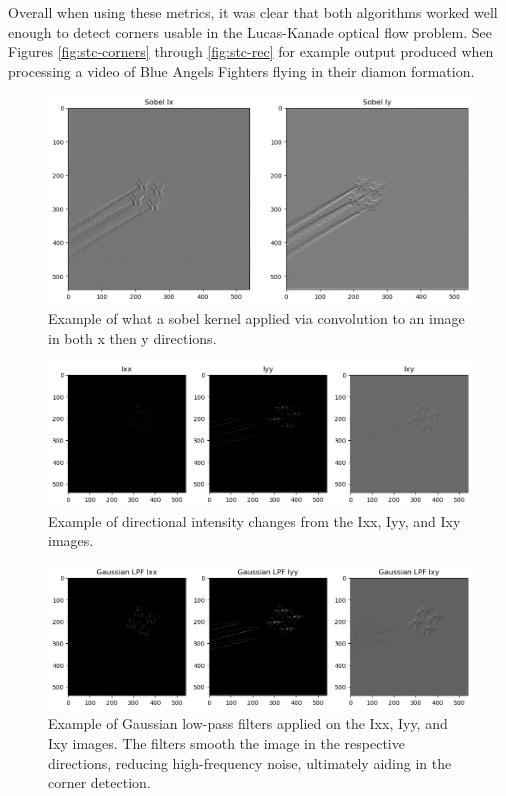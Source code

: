 \documentclass[11pt, conference, letterpaper]{IEEEtran}
\begin{document}
Overall when using these metrics, it was clear that both algorithms worked well enough to detect corners usable in the Lucas-Kanade optical flow problem. See Figures \ref{fig:stc-corners} through \ref{fig:stc-rec} for example output produced when processing a video of Blue Angels Fighters flying in their diamon formation.

\onecolumn
\begin{figure}[t]
    \centering
    \includegraphics[width=0.6\linewidth]{images/gradients_sample.png}
    \caption{Example of what a sobel kernel applied via convolution to an image in both x then y directions.}
    \label{fig:sobel_gradient}
\end{figure}

\begin{figure}[t]
    \centering
    \includegraphics[width=0.95\linewidth]{images/pre_gaussian_low_pass_filters.png}
    \caption{Example of directional intensity changes from the Ixx, Iyy, and Ixy images.}
    \label{fig:pre_gaussian_lpf}
\end{figure}

\begin{figure}[t]
    \centering
    \includegraphics[width=0.95\linewidth]{images/gaussian_low_pass_filters.png}
    \caption{Example of Gaussian low-pass filters applied on the Ixx, Iyy, and Ixy images. The filters smooth the image in the respective directions, reducing high-frequency noise, ultimately aiding in the corner detection.}
    \label{fig:gaussian_lpf}
\end{figure}
\end{document}
